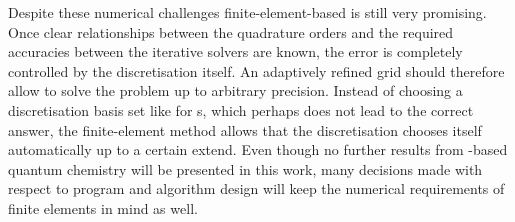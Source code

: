 Despite these numerical challenges
finite-element-based \HF is still very promising.
Once clear relationships between the quadrature orders
and the required accuracies between the iterative solvers
are known,
the error is completely controlled by the discretisation itself.
An adaptively refined grid should therefore allow to solve
the \HF problem up to arbitrary precision.
Instead of choosing a discretisation basis set
like for {\cGTO}s,
which perhaps does not lead to the correct answer,
the finite-element method
allows that the discretisation chooses itself automatically
up to a certain extend.
Even though no further results from \FE-based quantum chemistry
will be presented in this work,
many decisions made with respect to program and algorithm design
will keep the numerical requirements of finite elements
in mind as well.
